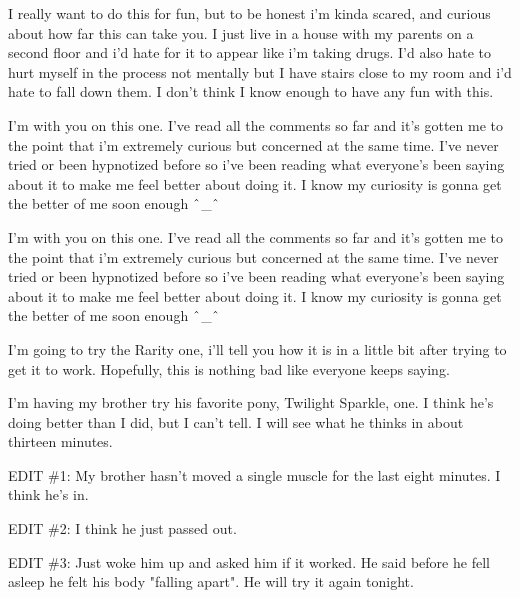 \documentclass[ebook,12pt,oneside,openany]{memoir}
\newcommand{\carat}{$\char`\^$}
\begin{document}
\begin{tcolorbox}[title=AngelofDeath]
\begin{tcolorbox}[title=TheFlowerPoison]
\par{I really want to do this for fun, but to be honest i'm kinda scared, and curious about how far this can take you. I just live in a house with my parents on a second floor and i'd hate for it to appear like i'm taking drugs. I'd also hate to hurt myself in the process not mentally but I have stairs close to my room and i'd hate to fall down them. I don't think I know enough to have any fun with this.}
\end{tcolorbox}
\par{I'm with you on this one. I've read all the comments so far and it's gotten me to the point that i'm extremely curious but concerned at the same time. I've never tried or been hypnotized before so i've been reading what everyone's been saying about it to make me feel better about doing it. I know my curiosity is gonna get the better of me soon enough  \carat{}\_\carat{}}
\end{tcolorbox}
\begin{tcolorbox}[title=TheFlowerPoison]
\begin{tcolorbox}[title=BeauDozer]
\par{I'm with you on this one. I've read all the comments so far and it's gotten me to the point that i'm extremely curious but concerned at the same time. I've never tried or been hypnotized before so i've been reading what everyone's been saying about it to make me feel better about doing it. I know my curiosity is gonna get the better of me soon enough  \carat{}\_\carat{}}
\end{tcolorbox}
\par{I'm going to try the Rarity one, i'll tell you how it is in a little bit after trying to get it to work. Hopefully, this is nothing bad like everyone keeps saying.}
\end{tcolorbox}
\begin{tcolorbox}[title=Mr. Forest]
\par{I'm having my brother try his favorite pony, Twilight Sparkle, one.  I think he's doing better than I did, but I can't tell.  I will see what he thinks in about thirteen minutes.}
\newline{}
\par{EDIT \#1:  My brother hasn't moved a single muscle for the last eight minutes.  I think he's in.}
\newline{}
\par{EDIT \#2:  I think he just passed out.}
\newline{}
\par{EDIT \#3:  Just woke him up and asked him if it worked.  He said before he fell asleep he felt his body "falling apart".  He will try it again tonight.}
\end{tcolorbox}
\end{document}
